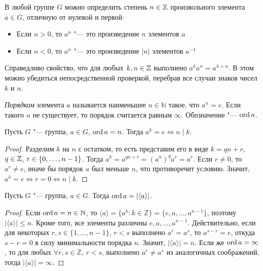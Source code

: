 \begin{note}
	В любой группе $G$ можно определить степень $n \in \mathbb{Z}$ произвольного элемента $a \in G$, отличную от нулевой и первой:
	\begin{itemize}
		\item Если $n > 0$, то $a^n$ "--- это произведение $n$ элементов $a$
		\item Если $n < 0$, то $a^n$ "--- это произведение $|n|$ элементов $a^{-1}$
	\end{itemize}

	Справедливо свойство, что для любых $k, n \in \mathbb{Z}$ выполнено $a^{k}a^{n} = a^{k + n}$. В этом можно убедиться непосредственной проверкой, перебрав все случаи знаков чисел $k$ и $n$.
\end{note}

\begin{definition}
	\textit{Порядком} элемента $a$ называется наименьшее $n \in \mathbb{N}$ такое, что $a^n = e$. Если такого $n$ не существует, то порядок считается равным $\infty$. Обозначение "--- $\operatorname{ord}{a}$.
\end{definition}

\begin{proposition}
	Пусть $G$ "--- группа, $a \in G$, $\operatorname{ord}{a} = n$. Тогда $a^k = e \Leftrightarrow n \mid k$.
\end{proposition}

\begin{proof}
	Разделим $k$ на $n$ с остатком, то есть представим его в виде $k = qn + r$, $q \in \mathbb{Z}$, $r \hm{\in} \{0, \dots, n-1\}$. Тогда $a^k = a^{qn + r} = (a^n)^qa^r = a^r$. Если $r \ne 0$, то $a^r \ne e$, иначе бы порядок $a$ был меньше $n$, что противоречит условию. Значит, $a^k = e \Leftrightarrow r = 0 \Leftrightarrow n \mid k$.
\end{proof}

\begin{proposition}
	Пусть $G$ "--- группа, $a \in G$. Тогда $\operatorname{ord}{a} = |\langle a\rangle|$.
\end{proposition}

\begin{proof}
	Если $\operatorname{ord}{a} = n \in \mathbb{N}$, то $\langle a\rangle = \{a^k: k \in \mathbb{Z}\} = \{e, a, \dots, a^{n-1}\}$, поэтому $|\langle a\rangle| \le n$. Кроме того, все элементы различны $e, a, \dots, a^{n-1}$. \pagebreak Действительно, если для некоторых $r, s \in \{1, \dots, n-1\}$, $r < s$ выполнено $a^r = a^s$, то $a^{s - r} = e$, откуда $s - r = 0$ в силу минимальности порядка $n$. Значит, $|\langle a\rangle| = n$. Если же $\operatorname{ord}{a} = \infty$, то для любых $\forall r, s \in \mathbb{Z}$, $r < s$, выполнено $a^r \ne a^s$ из аналогичных соображений, тогда $|\langle a\rangle| = \infty$.
\end{proof}

